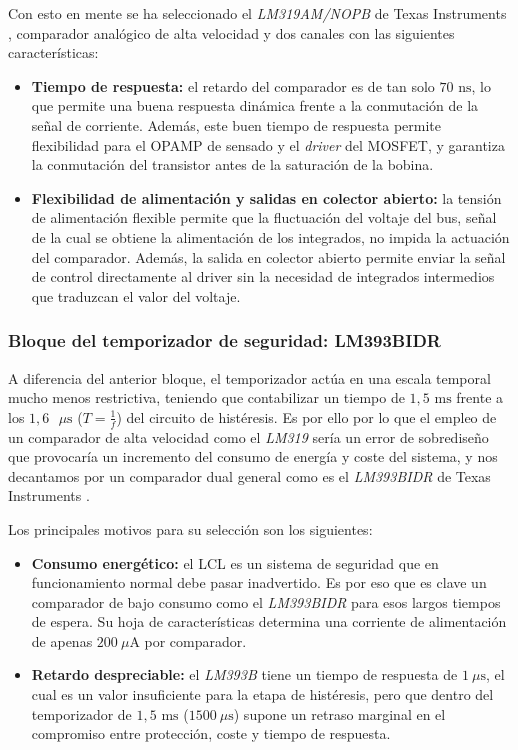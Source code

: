 \documentclass[12pt]{report} %
\begin{document}
Con esto en mente se ha seleccionado el \textit{LM319AM/NOPB} de Texas Instruments \cite{texas_instruments_lmx19_nodate}, comparador analógico de alta velocidad y dos canales con las siguientes características: 
\begin{itemize}
    \item \textbf{Tiempo de respuesta:} el retardo del comparador es de tan solo $70\text{ ns}$, lo que permite una buena respuesta dinámica frente a la conmutación de la señal de corriente. Además, este buen tiempo de respuesta permite flexibilidad para el OPAMP de sensado y el \textit{driver} del MOSFET, y garantiza la conmutación del transistor antes de la saturación de la bobina. 

    \item \textbf{Flexibilidad de alimentación y salidas en colector abierto:} la tensión de alimentación flexible permite que la fluctuación del voltaje del bus, señal de la cual se obtiene la alimentación de los integrados, no impida la actuación del comparador. Además, la salida en colector abierto permite enviar la señal de control directamente al driver sin la necesidad de integrados intermedios que traduzcan el valor del voltaje. 

\end{itemize}

\subsubsection{Bloque del temporizador de seguridad: LM393BIDR}
A diferencia del anterior bloque, el temporizador actúa en una escala temporal mucho menos restrictiva, teniendo que contabilizar un tiempo de $1{,}5\text{ ms}$ frente a los $1{,}6\text{ }\mu\text{s}$ ($T= \frac{1}{f}$) del circuito de histéresis. Es por ello por lo que el empleo de un comparador de alta velocidad como el \textit{LM319} sería un error de sobrediseño que provocaría un incremento del consumo de energía y coste del sistema, y nos decantamos por un comparador dual general como es el \textit{LM393BIDR} de Texas Instruments \cite{texas_instruments_lm393b_2026}. 

Los principales motivos para su selección son los siguientes: 
\begin{itemize}
    \item \textbf{Consumo energético:} el LCL es un sistema de seguridad que en funcionamiento normal debe pasar inadvertido. Es por eso que es clave un comparador de bajo consumo como el \textit{LM393BIDR} para esos largos tiempos de espera. Su hoja de características determina una corriente de alimentación de apenas $200\ \mu\text{A}$ por comparador.
    \item \textbf{Retardo despreciable:} el \textit{LM393B} tiene un tiempo de respuesta de $1\ \mu\text{s}$, el cual es un valor insuficiente para la etapa de histéresis, pero que dentro del temporizador de $1{,}5\text{ ms}$ ($1500\ \mu\text{s}$) supone un retraso marginal en el compromiso entre protección, coste y tiempo de respuesta.
\end{itemize}
\end{document}
